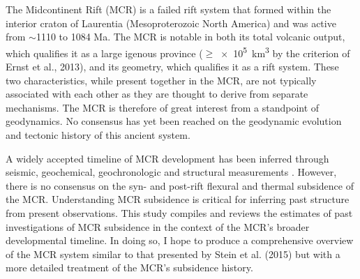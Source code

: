 \documentclass[12pt,letterpaper]{article}
\renewenvironment{abstract}
 {\small
  \begin{center}
  \bfseries \abstractname\vspace{-.5em}\vspace{0pt}
  \end{center}
  \list{}{
    \setlength{\leftmargin}{.5cm}%
    \setlength{\rightmargin}{\leftmargin}%
  }%
  \item\relax}
 {\endlist}
\begin{document}
\begin{abstract}
The Midcontinent Rift (MCR) is a failed rift system that formed within the interior craton of Laurentia (Mesoproterozoic North America) and was active from $\sim$1110 to 1084 Ma. The MCR is notable in both its total volcanic output, which qualifies it as a large igenous province ($\geq$\SI{e5}{km^3} by the criterion of Ernst et al., 2013\nocite{Ernst2013b}), and its geometry, which qualifies it as a rift system. These two characteristics, while present together in the MCR, are not typically associated with each other as they are thought to derive from separate mechanisms. The MCR is therefore of great interest from a standpoint of geodynamics. No consensus has yet been reached on the geodynamic evolution and tectonic history of this ancient system.\par
A widely accepted timeline of MCR development has been inferred through seismic, geochemical, geochronologic and structural measurements \citep{Cannon1989a,Cannon1992b,White1997a,Stein2015a}. However, there is no consensus on the syn- and post-rift flexural and thermal subsidence of the MCR. Understanding MCR subsidence is critical for inferring past structure from present observations. This study compiles and reviews the estimates of past investigations of MCR subsidence in the context of the MCR's broader developmental timeline. In doing so, I hope to produce a comprehensive overview of the MCR system similar to that presented by Stein et al. (2015) but with a more detailed treatment of the MCR's subsidence history.
\end{abstract}
\end{document}
